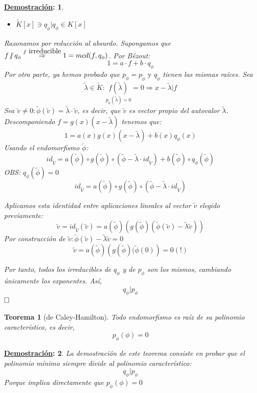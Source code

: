 \documentclass[10pt,a4paper,openright]{book}
\theoremstyle{break}
\newtheorem*{theo}{Teorema}
\newtheorem*{demo}{\underline{Demostración}:}
\begin{document}
\begin{demo}
\begin{itemize}
\item $\tilde{K}[x] \ni q_{\tilde{\phi}} | q_\phi \in K[x]$
\end{itemize}

Razonamos por reducción al absurdo. Supongamos que $f \centernot \mid q_\phi \overset{f \mbox{ irreducible}}{\Rightarrow} 1 = mcd(f, q_\phi)$. Por Bézout:
$$1 = a\cdot f + b \cdot q_\phi$$
Por otra parte, ya hemos probado que $p_\phi = p_{\tilde{\phi}} \mbox{ y } q_{\tilde{\phi}}$ tienen las mismas raíces. Sea $$\tilde{\lambda} \in \tilde{K} : \underset{ p_{\tilde{\phi}} (\tilde{\lambda}) = 0}{f(\tilde{\lambda})} = 0 \Rightarrow x - \tilde{\lambda} | f$$
Sea $\tilde{v} \neq 0 : \tilde{\phi} (\tilde{v}) = \tilde{\lambda} \cdot \tilde{v}$, es decir, que $\tilde{v}$ es vector propio del autovalor $\tilde{\lambda}$. Descomponiendo $f = g(x)(x-\tilde{\lambda})$ tenemos que:
$$1 = a(x)g(x)(x-\tilde{\lambda}) + b(x)q_\phi (x) $$
Usando el endomorfismo $\tilde{\phi}$:
$$id_{\tilde{V}} = a(\tilde{\phi})\circ g(\tilde{\phi}) \circ(\tilde{\phi} - \tilde{\lambda} \cdot id_{\tilde{V}}) + b(\tilde{\phi}) \circ q_\phi (\tilde{\phi})$$
OBS: $q_\phi (\tilde{\phi}) = 0$
$$id_{\tilde{V}} = a(\tilde{\phi})\circ g(\tilde{\phi}) \circ(\tilde{\phi} - \tilde{\lambda} \cdot id_{\tilde{V}})$$

Aplicamos esta identidad entre aplicaciones lineales al vector $\tilde{v}$ elegido previamente:
$$\tilde{v} = id_{\tilde{V}} (\tilde{v})= a(\tilde{\phi})\left( g(\tilde{\phi})( \tilde{\phi}(\tilde{v}) - \tilde{\lambda}\tilde{v})\right)$$
Por construcción de $\tilde{v} : \tilde{\phi}(\tilde{v}) - \tilde{\lambda}\tilde{v} = 0$
$$\tilde{v} = a(\tilde{\phi})\left( g(\tilde{\phi})( \tilde{\phi}(0)\right) = 0 (!)$$

Por tanto, todos los irreducibles de $q_\phi$ y de $p_\phi$ son los mismos, cambiando únicamente los exponentes. Así, $$q_\phi | p_\phi$$
$\hfill\square$
\end{demo}

\begin{theo}[de Caley-Hamilton]
Todo endomorfismo es raíz de su polinomio característico, es decir,
$$p_\phi (\phi) = 0$$
\end{theo}
\begin{demo}
La demostración de este teorema consiste en probar que el polinomio mínimo siempre divide al polinomio característico:
$$q_\phi | p_\phi$$
Porque implica directamente que $p_\phi (\phi) = 0$
\end{demo}
\end{document}
